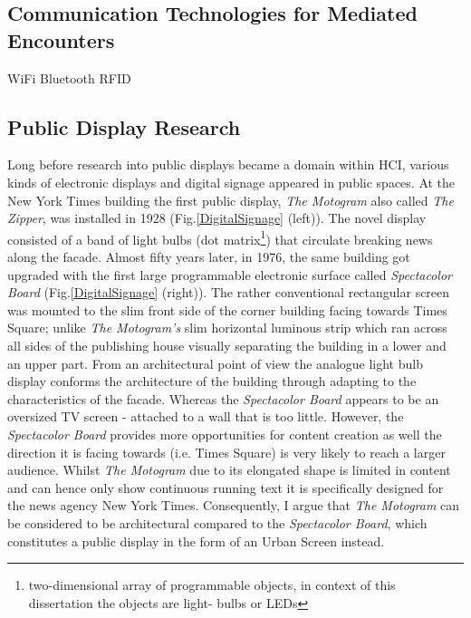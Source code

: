 
\subsection{Communication Technologies for Mediated Encounters}

WiFi
Bluetooth
RFID


\subsection{Public Display Research}

Long before research into public displays  became a domain within HCI, various kinds of electronic displays and digital signage appeared in public spaces.
At the New York Times building the first public display, \textit{The Motogram}  also called \textit{The Zipper}, was installed in 1928 (Fig.\ref{DigitalSignage} (left)). The novel display consisted of a band of light bulbs (dot matrix\footnote{two-dimensional array of programmable objects, in context of this dissertation the objects are light- bulbs or LEDs}) that circulate breaking news along the facade. 
Almost fifty years later, in 1976, the same building got upgraded with the first large programmable electronic surface called \textit{Spectacolor Board} (Fig.\ref{DigitalSignage} (right)).
The rather conventional rectangular screen was mounted to the slim front side of the corner building facing towards Times Square; unlike \textit{The Motogram's} slim horizontal luminous strip which ran across all sides of the publishing house visually separating the building in a lower and an upper part. 
From an architectural point of view the analogue light bulb display conforms the architecture of the building through adapting to the characteristics of the facade. Whereas the \textit{Spectacolor Board} appears to be an oversized TV screen - attached to a wall that is too little. However, the \textit{Spectacolor Board} provides more opportunities for content creation as well the direction it is facing towards (i.e. Times Square) is very likely to reach a larger audience. Whilst \textit{The Motogram} due to its elongated shape is limited in content and can hence only show continuous running text it is specifically designed for the news agency New York Times.
Consequently, I argue that \textit{The Motogram} can be considered to be architectural compared to the \textit{Spectacolor Board}, which constitutes a public display in the form of an Urban Screen instead.

